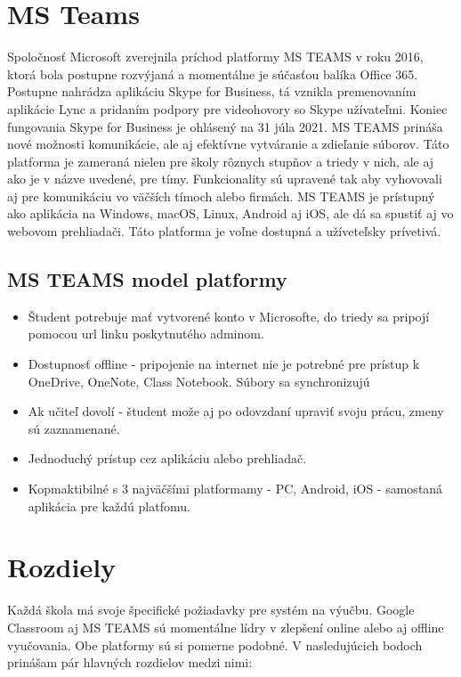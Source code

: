 \documentclass[10pt,slovak,a4paper]{article}
\begin{document}
\section{MS Teams} \label{MS Teams}
Spoločnosť Microsoft zverejnila príchod platformy MS TEAMS v roku 2016, ktorá bola postupne rozvýjaná a momentálne je súčasťou balíka Office 365. Postupne nahrádza aplikáciu Skype for Business, tá vznikla premenovaním aplikácie Lync a pridaním podpory pre videohovory so Skype užívateľmi. Koniec fungovania Skype for Business je ohlásený na 31 júla 2021. MS TEAMS prináša nové možnosti komunikácie, ale aj efektívne vytváranie a zdieľanie súborov. Táto platforma je zameraná nielen pre školy rôznych stupňov a triedy v nich, ale aj ako je v názve uvedené, pre tímy. Funkcionality sú upravené tak aby vyhovovali aj pre komunikáciu vo väčších tímoch alebo firmách. MS TEAMS je prístupný ako aplikácia na Windows, macOS, Linux, Android aj iOS, ale dá sa spustiť aj vo webovom prehliadači. Táto platforma je voľne dostupná a užíveteľsky prívetivá. \cite {MS-TEAMS}

\subsection{MS TEAMS  model platformy} \label{MS TEAMS: MS TEAMS  model platformy}

\begin{itemize}
	\item Študent potrebuje mať vytvorené konto v Microsofte, do triedy sa pripojí pomocou url linku poskytnutého adminom.
	\item Dostupnosť offline - pripojenie na internet nie je potrebné pre prístup k OneDrive, OneNote, Class Notebook. Súbory sa synchronizujú
 	\item Ak učiteľ dovolí - študent može aj po odovzdaní upraviť svoju prácu, zmeny sú zaznamenané.
	\item Jednoduchý prístup cez aplikáciu alebo prehliadač.
	\item Kopmaktibilné s 3 najväčšími platformamy - PC, Android, iOS - samostaná aplikácia pre každú platfomu. 
\cite {porovnanie}
	\end{itemize}

\section{Rozdiely } \label{Rozdiely}
Každá škola má svoje špecifické požiadavky pre systém na výučbu. Google Classroom aj MS TEAMS sú momentálne lídry v zlepšení online alebo aj offline vyučovania. Obe platformy sú si pomerne podobné. V nasledujúcich bodoch prinášam pár hlavných rozdielov medzi nimi:
\end{document}
